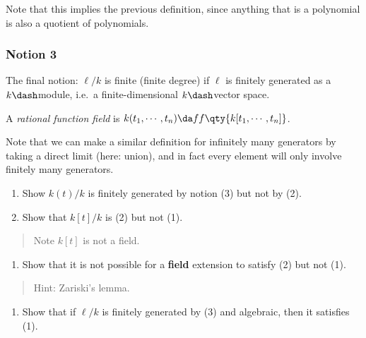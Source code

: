 Note that this implies the previous definition, since anything that is a
polynomial is also a quotient of polynomials.

\hypertarget{notion-3}{%
\subsubsection{Notion 3}\label{notion-3}}

The final notion: \(\ell/k\) is finite (finite degree) if \(\ell\) is
finitely generated as a \(k\dash\)module, i.e.~a finite-dimensional
\(k\dash\)vector space.

\begin{definition}

A \emph{rational function field} is
\(k(t_1, \cdots, t_n) \da ff \qty{ k[t_1, \cdots, t_n]}\).

\end{definition}

Note that we can make a similar definition for infinitely many
generators by taking a direct limit (here: union), and in fact every
element will only involve finitely many generators.

\begin{exercise}

\hfill

\begin{enumerate}
\def\labelenumi{\alph{enumi}.}
\item
  Show \(k(t) / k\) is finitely generated by notion (3) but not by (2).
\item
  Show that \(k[t]/k\) is (2) but not (1).
\end{enumerate}

\begin{quote}
Note \(k[t]\) is not a field.
\end{quote}

\begin{enumerate}
\def\labelenumi{\alph{enumi}.}
\setcounter{enumi}{2}
\tightlist
\item
  Show that it is not possible for a \textbf{field} extension to satisfy
  (2) but not (1).
\end{enumerate}

\begin{quote}
Hint: Zariski's lemma.
\end{quote}

\begin{enumerate}
\def\labelenumi{\alph{enumi}.}
\setcounter{enumi}{3}
\tightlist
\item
  Show that if \(\ell/k\) is finitely generated by (3) and algebraic,
  then it satisfies (1).
\end{enumerate}

\end{exercise}

